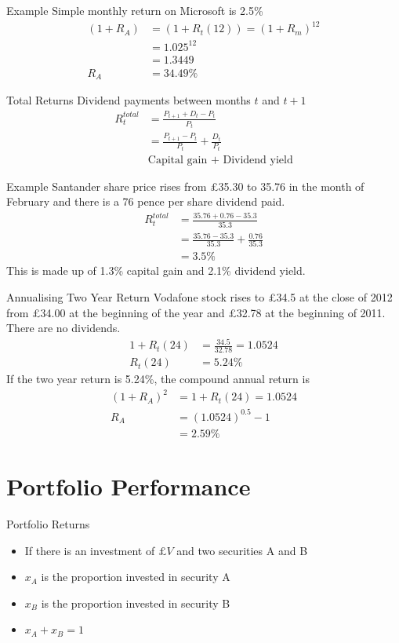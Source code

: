 \documentclass[14pt,xcolor=pdftex,dvipsnames,table]{beamer}
\begin{document}
\begin{frame}{Example}
Simple monthly return on Microsoft is 2.5\%
\begin{align*}
(1+R_A) &= (1 + R_t(12)) = (1+ R_m)^{12}\\
&= 1.025^{12}\\
&= 1.3449\\
R_A &= 34.49\%
\end{align*}
\end{frame}

\begin{frame}{Total Returns}
Dividend payments between months $t$ and $t+1$
\begin{align*}
R_t^{total} &= \frac{P_{t+1} + D_t - P_t}{P_t} \\ 
& = \frac{P_{t+1}-P_t}{P_t} + \frac{D_t}{P_t}\\
& \text{Capital gain + Dividend yield}
\end{align*}
\end{frame}

\begin{frame}{Example}
Santander share price rises from £35.30 to 35.76 in the month of February and there is a 76 pence per share dividend paid.  
\begin{align*}
R_t^{total} &= \frac{35.76+ 0.76 -35.3}{35.3} \\
& = \frac{35.76-35.3}{35.3} + \frac{0.76}{35.3}\\
& = 3.5\%
\end{align*}
This is made up of 1.3\% capital gain and 2.1\% dividend yield. 
\end{frame}

\begin{frame}{Annualising Two Year Return}
Vodafone stock rises to £34.5 at the close of 2012 from £34.00 at the beginning of the year and £32.78 at the beginning of 2011.  There are no dividends. 
\begin{align*}
1+R_t(24) &= \frac{34.5}{32.78} = 1.0524\\
R_t(24) &= 5.24\%
\end{align*}
If the two year return is 5.24\%, the compound annual  return is 
\begin{align*}
(1 + R_A)^2 &= 1 +R_t(24) = 1.0524\\
R_A &= (1.0524)^{0.5} - 1\\
&= 2.59\%
\end{align*}
\end{frame}


\section{Portfolio Performance}
\begin{frame}{Portfolio Returns}
\begin{itemize}
\item If there is an investment of $£V$ and two securities A and B
\item $x_A$ is the proportion invested in security A
\item $x_B$ is the proportion invested in security B
\item $x_A + x_B = 1$
\end{itemize}
\end{frame}
\end{document}
